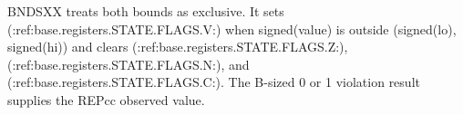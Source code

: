 BNDSXX treats both bounds as exclusive. It sets (:ref:base.registers.STATE.FLAGS.V:) when signed(value) is outside (signed(lo), signed(hi)) and clears (:ref:base.registers.STATE.FLAGS.Z:), (:ref:base.registers.STATE.FLAGS.N:), and (:ref:base.registers.STATE.FLAGS.C:). The B-sized 0 or 1 violation result supplies the REPcc observed value.
